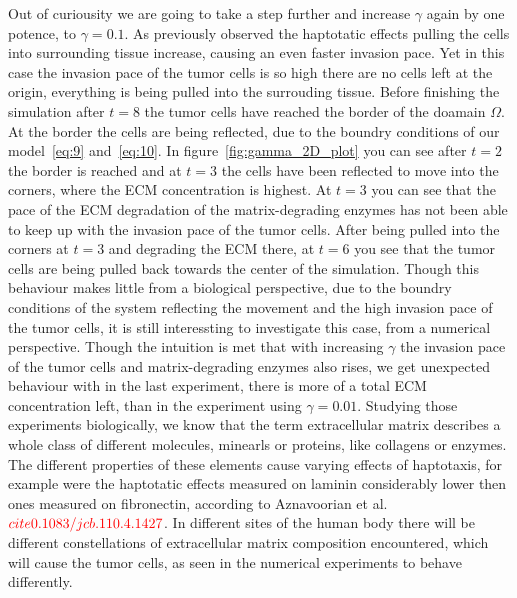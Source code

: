 Out of curiousity we are going to take a step further and increase $\gamma$ again by one potence, to $\gamma=0.1$. As previously observed the haptotatic effects pulling the cells into surrounding tissue increase, causing an even faster invasion pace. Yet in this case the invasion pace of the tumor cells is so high there are no cells left at the origin, everything is being pulled into the surrouding tissue. Before finishing the simulation after $t=8$ the tumor cells have reached the border of the doamain $\Omega$. At the border the cells are being reflected, due to the boundry conditions of our model~\ref{eq:9} and~\ref{eq:10}. In figure~\ref{fig:gamma_2D_plot} you can see after $t=2$ the border is reached and at $t=3$ the cells have been reflected to move into the corners, where the ECM concentration is highest. At $t=3$ you can see that the pace of the ECM degradation of the matrix-degrading enzymes has not been able to keep up with the invasion pace of the tumor cells. After being pulled into the corners at $t=3$ and degrading the ECM there, at $t=6$ you see that the tumor cells are being pulled back towards the center of the simulation.
Though this behaviour makes little from a biological perspective, due to the boundry conditions of the system reflecting the movement and the high invasion pace of the tumor cells, it is still interessting to investigate this case, from a numerical perspective.\newline
Though the intuition is met that with increasing $\gamma$ the invasion pace of the tumor cells and matrix-degrading enzymes also rises, we get unexpected behaviour with in the last experiment, there is more of a total ECM concentration left, than in the experiment using $\gamma=0.01$.
Studying those experiments biologically, we know that the term extracellular matrix describes a whole class of different molecules, minearls or proteins, like collagens or enzymes. The different properties of these elements cause varying effects of haptotaxis, for example were the haptotatic effects measured on laminin considerably lower then ones measured on fibronectin, according to Aznavoorian et al.$\textcolor{red}{cite0.1083/jcb.110.4.1427}$. In different sites of the human body there will be different constellations of extracellular matrix composition encountered, which will cause the tumor cells, as seen in the numerical experiments to behave differently.

